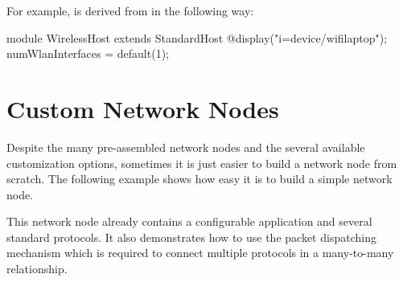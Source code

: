 For example,  is derived from 
in the following way:

\begin{ned}
module WirelessHost extends StandardHost 
{
    @display("i=device/wifilaptop");
    numWlanInterfaces = default(1);
}
\end{ned}

\section{Custom Network Nodes}

Despite the many pre-assembled network nodes and the several available
customization options, sometimes it is just easier to build a network node
from scratch. The following example shows how easy it is to build a simple
network node.

This network node already contains a configurable application and several
standard protocols. It also demonstrates how to use the packet dispatching
mechanism which is required to connect multiple protocols in a many-to-many
relationship.





